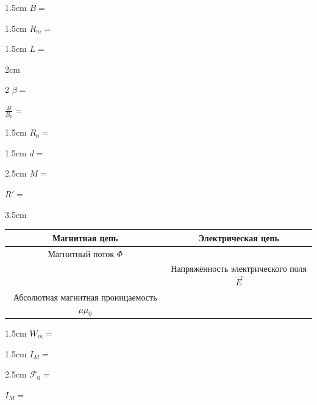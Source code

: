 
\begin{answerbox}{1.5cm}
\(B=\)
\end{answerbox}

\begin{answerbox}{1.5cm}
\(R_m=\)
\end{answerbox}

\begin{answerbox}{1.5cm}
\(L=\)
\end{answerbox}

\begin{answerbox}{2cm}
\begin{multicols}{2}
\(\beta=\)

\columnbreak

\(\frac{B}{B_0}=\)
\end{multicols}
\end{answerbox}

\begin{answerbox}{1.5cm}
\(R_0=\)
\end{answerbox}

\begin{answerbox}{1.5cm}
\(d=\)
\end{answerbox}

\begin{answerbox}{2.5cm}
\(M=\)

\bigskip

\(R'=\)
\end{answerbox}

\begin{answerbox}{3.5cm}
\vspace{-\OlympAnswerGap}
\begin{center}
\begin{tabular}{|c|c|}\hline
\textbf{Магнитная цепь}&\textbf{Электрическая цепь}\\\hline
Магнитный поток \(\Phi\)& \\\hline
& Напряжённость электрического поля \(\vec E\)\\\hline
Абсолютная магнитная проницаемость \(\mu\mu_0\)& \\\hline
\end{tabular}
\end{center}
\end{answerbox}

\begin{answerbox}{1.5cm}
\(W_m=\)
\end{answerbox}

\begin{answerbox}{1.5cm}
\(I_M=\)
\end{answerbox}

\begin{answerbox}{2.5cm}
\(\mathcal F_0=\)

\bigskip

\(I_M=\)
\end{answerbox}
